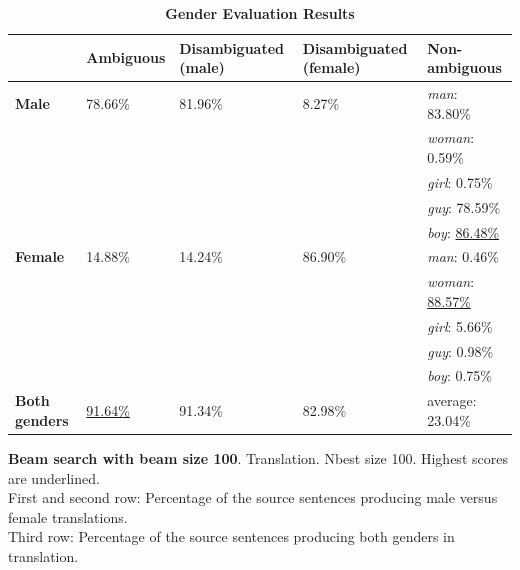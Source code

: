 \begin{table}[!htb]
    \begin{subtable}{\textwidth}
        \centering
        \begin{tabularx}{\linewidth}{|X|XXXX|}
            \hline
             & \textbf{Ambiguous} & \textbf{Disambiguated (male)} & \textbf{Disambiguated (female)} & \textbf{Non-ambiguous} \\ \hline
             \textbf{Male} & 78.66\% & 81.96\% & 8.27\% & \textit{man}: 83.80\% \\
             &&&& \textit{woman}: 0.59\% \\
             &&&& \textit{girl}: 0.75\% \\
             &&&& \textit{guy}: 78.59\% \\
             &&&& \textit{boy}: \underline{86.48\%} \\ \hline
             \textbf{Female} & 14.88\% & 14.24\% & 86.90\% & \textit{man}: 0.46\% \\ 
             &&&& \textit{woman}: \underline{88.57\%} \\
             &&&& \textit{girl}: 5.66\% \\
             &&&& \textit{guy}: 0.98\% \\
             &&&& \textit{boy}: 0.75\% \\\hline
             \textbf{Both genders} & \underline{91.64\%} & 91.34\% & 82.98\% & average: 23.04\% \\ \hline
        \end{tabularx}
        \caption{\textbf{Beam search with beam size 100}. Translation. Nbest size 100. Highest scores are underlined. \\ First and second row: Percentage of the source sentences producing male versus female translations. \\ Third row: Percentage of the source sentences producing both genders in translation.}
        \label{tab:gender_percent_100}
    \end{subtable}
    
    \caption{\textbf{Gender Evaluation Results}}
    \label{tab:gender_percent}
\end{table}
\clearpage %
